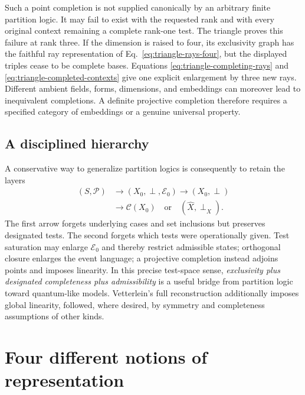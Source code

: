 \documentclass[
  aps,
  pra,
  twocolumn,
  amsmath,
  amssymb,
  longbibliography,
  nofootinbib,
  floatfix
]{revtex4-2}
\newcommand{\cP}{\mathcal P}
\newcommand{\cC}{\mathcal C}
\newcommand{\cE}{\mathcal E}
\begin{document}
Such a point completion is not supplied canonically by an arbitrary finite
partition logic.  It may fail to exist with the requested rank and with every
original context remaining a complete rank-one test.  The triangle proves this
failure at rank three.  If the dimension is raised to four, its exclusivity
graph has the faithful ray representation of
Eq.~\eqref{eq:triangle-rays-four}, but
the displayed triples cease to be complete bases.  Equations
\eqref{eq:triangle-completing-rays} and
\eqref{eq:triangle-completed-contexts} give one explicit enlargement by three
new rays.  Different ambient fields, forms, dimensions, and embeddings can
moreover lead to inequivalent completions.  A definite projective completion
therefore requires a specified category of embeddings or a genuine universal
property.

\subsection{A disciplined hierarchy}

A conservative way to generalize partition logics is consequently to retain
the layers
\begin{equation}
\begin{aligned}
(S,\cP)&\longrightarrow (X_0,\perp,\cE_0)
\longrightarrow (X_0,\perp)\\
&\longrightarrow \cC(X_0)
\quad\text{or}\quad
(\widehat X,\perp_{\widehat X}).
\end{aligned}
  \label{eq:completion-hierarchy}
\end{equation}
The first arrow forgets underlying cases and set inclusions but preserves
designated tests.  The second forgets which tests were operationally given.
Test saturation may enlarge $\cE_0$ and thereby restrict admissible states;
orthogonal closure enlarges the event language; a projective completion instead
adjoins points and imposes linearity.  In this precise test-space sense,
\emph{exclusivity plus designated completeness plus admissibility} is a useful
bridge from partition logic toward quantum-like models.  Vetterlein's full
reconstruction additionally imposes global linearity, followed, where desired,
by symmetry and completeness assumptions of other kinds.

\section{Four different notions of representation}
\label{sec:representations}
\end{document}
